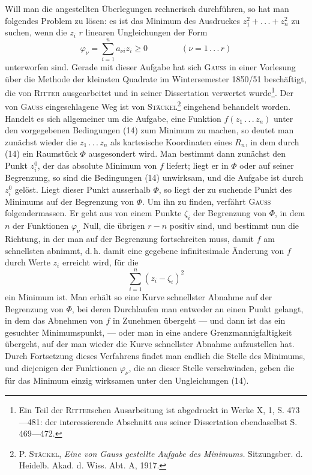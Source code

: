 Will man die angestellten Überlegungen rechnerisch durchführen, so hat
man folgendes Problem zu lösen: es ist das Minimum des Ausdruckes
$z_1^2+ .\, .\, .+z_n^2$ zu suchen, wenn die $z_i$ $r$ linearen Ungleichungen der Form
\[
\varphi_\nu=\sum_{i=1}^{n}a_{\nu i}z_i\geq0
\qquad\qquad(\nu=1\, .\, .\, .\, r)\tag{14}
\]
\noindent unterworfen sind. Gerade mit dieser Aufgabe hat sich \textsc{Gauss} in einer Vorlesung
über die Methode der kleinsten Quadrate im Wintersemester 1850/51 beschäftigt,
die von \textsc{Ritter} ausgearbeitet und in seiner Dissertation verwertet wurde\footnote{Ein Teil der \textsc{Ritter}schen Ausarbeitung ist abgedruckt in Werke X, 1, S. 473—481: der interessierende
Abschnitt aus seiner Dissertation ebendaselbst S. 469—472.}. Der
von \textsc{Gauss} eingeschlagene Weg ist von \textsc{Stäckel}\footnote{P. \textsc{Stäckel}, \textit{Eine von Gauss gestellte Aufgabe des Minimums.} Sitzungsber. d. Heidelb. Akad.
d. Wiss. Abt. A, 1917.} eingehend behandelt worden.
Handelt es sich allgemeiner um die Aufgabe, eine Funktion $f(z_1\, .\, .\, .\, z_n)$ unter
den vorgegebenen Bedingungen (14) zum Minimum zu machen, so deutet man
zunächst wieder die $z_1\, .\, .\, .\, z_n$ als kartesische Koordinaten eines $R_n$, in dem
durch (14) ein Raumstück $\Phi$ ausgesondert wird. Man bestimmt dann zunächst
den Punkt $z_i^0$, der das absolute Minimum von $f$ liefert; liegt er in $\Phi$ oder
auf seiner Begrenzung, so sind die Bedingungen (14) unwirksam, und die Aufgabe
ist durch $z_i^0$ gelöst. Liegt dieser Punkt ausserhalb $\Phi$, so liegt der zu
suchende Punkt des Minimums auf der Begrenzung von $\Phi$. Um ihn zu finden,
verfährt \textsc{Gauss} folgendermassen. Er geht aus von einem Punkte $\zeta_i$ der Begrenzung
von $\Phi$, in dem $n$ der Funktionen $\varphi_\nu$ Null, die übrigen $r-n$ positiv
sind, und bestimmt nun die Richtung, in der man auf der Begrenzung fortschreiten
muss, damit $f$ am schnellsten abnimmt, d.\,h. damit eine gegebene
infinitesimale Änderung von $f$ durch Werte $z_i$ erreicht wird, für die
\[
\sum_{i=1}^{n}(z_i-\zeta_i)^2
\]
\noindent ein Minimum ist. Man erhält so eine Kurve schnellster Abnahme auf der
\clearpage{}
\noindent Begrenzung von $\Phi$, bei deren Durchlaufen man entweder an einen Punkt gelangt,
in dem das Abnehmen von $f$ in Zunehmen übergeht — und dann ist
das ein gesuchter Minimumspunkt, — oder man in eine andere Grenzmannigfaltigkeit
übergeht, auf der man wieder die Kurve schnellster Abnahme
aufzustellen hat. Durch Fortsetzung dieses Verfahrens findet man endlich
die Stelle des Minimums, und diejenigen der Funktionen $\varphi_\nu$, die an dieser
Stelle verschwinden, geben die für das Minimum einzig wirksamen unter den
Ungleichungen (14).

